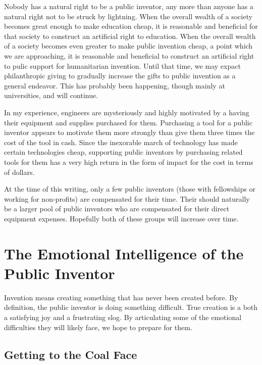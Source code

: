\documentclass[
	fontsize=10pt, %
	twoside=false, %
	secnumdepth=1, %
]{kaobook}
\begin{document}
Nobody has a natural right to be a public inventor, any more than
anyone has a natural right not to be struck by lightning.
When the overall wealth of a society becomes great enough to make
education cheap, it is reasonable and beneficial for that society to construct an
artificial right to education. When the overall wealth of a society
becomes even greater to make public invention cheap, a point which
we are approaching, it is reasonable and beneficial to construct
an artificial right to pulic support for humanitarian invention.
Until that time, we may expact philanthropic giving to gradually
increase the gifts to public invention as a general endeavor.
This has probably been happening, though mainly at universities, and will continue.

In my experience, engineers are mysteriously and highly motivated by a having their
equipment and supplies purchased for them.
Purchasing a tool for a public inventor appears to motivate them more strongly
than give them three times the cost of the tool in cash. Since
the inexorable march of technology has made certain technologies cheap,
supporting public inventors by purchasing related tools for them
has a very high return in the form of impact for the cost in terms of
dollars.

At the time of this writing, only a few public inventors (those
with fellowships or working for non-profits) are compensated for their
time. Their should naturally be a larger pool of public inventors who
are compensated for their direct equipment expenses. Hopefully
both of these groups will increase over time.

\chapter{The Emotional Intelligence of the Public Inventor}

Invention means creating something that has never been
created before.
By definition, the public inventor is doing something
difficult.
True creation is a both a satisfying
joy and a frustrating slog.
By articulating some of the emotional difficulties
they will likely face, we hope to prepare for them.

\section{Getting to the Coal Face}
\end{document}

